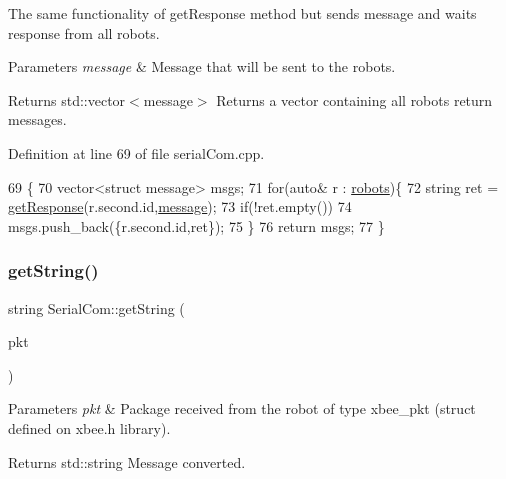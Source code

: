 The same functionality of get\+Response method but sends message and waits response from all robots. 


\begin{DoxyParams}{Parameters}
{\em message} & Message that will be sent to the robots. \\
\hline
\end{DoxyParams}
\begin{DoxyReturn}{Returns}
std\+::vector$<$message$>$ Returns a vector containing all robots return messages. 
\end{DoxyReturn}


Definition at line 69 of file serial\+Com.\+cpp.


\begin{DoxyCode}
69                                                                   \{
70     vector<struct message> msgs;
71     \textcolor{keywordflow}{for}(\textcolor{keyword}{auto}& r : \hyperlink{class_serial_com_ae20f6fe8f53cb581b285924eda5ad01c}{robots})\{
72         \textcolor{keywordtype}{string} ret = \hyperlink{class_serial_com_a7680deb087f1746d4d8c38d6fc2d25fb}{getResponse}(r.second.id,\hyperlink{structmessage}{message});
73         \textcolor{keywordflow}{if}(!ret.empty())
74             msgs.push\_back(\{r.second.id,ret\});
75     \}
76     \textcolor{keywordflow}{return} msgs;
77 \}
\end{DoxyCode}
\mbox{\label{class_serial_com_a2171dcfcdcecc0ac18b9e206b28608be}} 
\subsubsection{\texorpdfstring{get\+String()}{getString()}}
{\footnotesize\ttfamily string Serial\+Com\+::get\+String (\begin{DoxyParamCaption}\item[{xbee\+\_\+pkt $\ast$}]{pkt }\end{DoxyParamCaption})}


\begin{DoxyParams}{Parameters}
{\em pkt} & Package received from the robot of type xbee\+\_\+pkt (struct defined on xbee.\+h library). \\
\hline
\end{DoxyParams}
\begin{DoxyReturn}{Returns}
std\+::string Message converted. 
\end{DoxyReturn}


